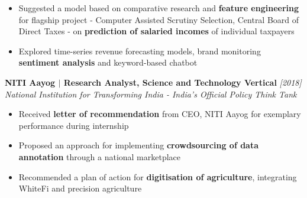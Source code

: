 \documentclass{article}
\begin{document}
\begin{itemize}[itemsep = -0.65 mm, leftmargin=*]
\item Suggested a model based on comparative research and \textbf{feature engineering} for flagship project - Computer Assisted Scrutiny Selection, Central Board of Direct Taxes - on \textbf{prediction of salaried incomes} of individual taxpayers 
\item Explored time-series revenue forecasting models, brand monitoring \textbf{sentiment analysis} and keyword-based chatbot
\end{itemize}
\textbf{\fontsize{10.7}{13}\selectfont NITI Aayog $|$ Research Analyst, Science and Technology Vertical} \hfill{\sl [2018]}\\
{\sl National Institution for Transforming India - India's Official Policy Think Tank} \\
\vspace{-17pt}
\begin{itemize}[itemsep = -0.65 mm, leftmargin=*]
\item Received \textbf{letter of recommendation} from CEO, NITI Aayog for exemplary performance during internship
\item Proposed an approach for implementing \textbf{crowdsourcing of data annotation} through a national marketplace
\item  Recommended a plan of action for \textbf{digitisation of agriculture}, integrating WhiteFi and precision agriculture
\end{itemize}
\vspace{-11pt}
\end{document}
